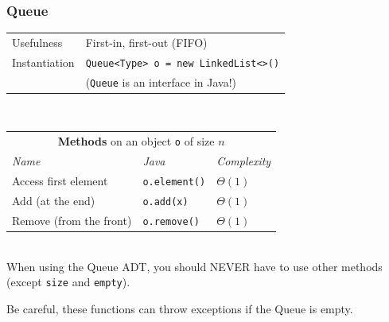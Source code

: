 \documentclass[8pt,aspectratio=169]{beamer}
\begin{document}
\begin{frame}
\frametitle{Queue}
\centering
\begin{tabular}{ll}
	Usefulness & First-in, first-out (FIFO)\\
	Instantiation & \texttt{Queue<Type> o = new LinkedList<>()}\\
	& \color{red} (\texttt{Queue} is an interface in Java!)\\
\end{tabular}\\
\vspace{0.5cm}
\centering
\begin{tabular}{lll}
	\multicolumn{3}{c}{\textbf{Methods} on an object \texttt{o} of size $n$} \\
	\textit{Name} & \textit{Java} & \textit{Complexity} \\
	Access first element & \texttt{o.element()} & $\Theta(1)$\\
	Add (at the end) & \texttt{o.add(x)} & $\Theta(1)$\\
	Remove (from the front) & \texttt{o.remove()} & $\Theta(1)$\\
\end{tabular}\\
\vspace{0.5cm}
\color{blue} When using the Queue ADT, you should NEVER have to use other methods (except \texttt{size} and \texttt{empty}).

\color{blue} Be careful, these functions can throw exceptions if the Queue is empty.
\end{frame}
\end{document}
